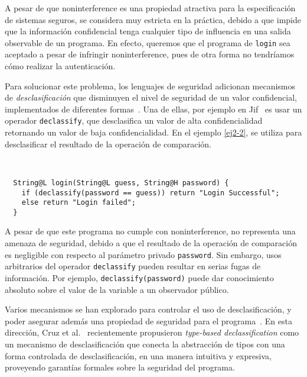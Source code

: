 A pesar de que noninterference es una propiedad atractiva para la especificación de sistemas seguros, se considera muy estricta en la práctica, debido a que impide que la información confidencial tenga cualquier tipo de influencia en una salida observable de un programa. En efecto, queremos que el programa de \texttt{login} sea aceptado a pesar de infringir noninterference, pues de otra forma no tendríamos cómo realizar la autenticación.

Para solucionar este problema, los lenguajes de seguridad adicionan mecanismos de \emph{desclasificación} que disminuyen el nivel de seguridad de un valor confidencial, implementados de diferentes formas~\cite{sabelfeldSands:JCS09}. Una de ellas, por ejemplo en Jif~\cite{jif} es usar un operador \texttt{declassify}, que desclasifica un valor de alta confidencialidad retornando un valor de baja confidencialidad. En el ejemplo \ref{ej2-2}, se utiliza para desclasificar el resultado de la operación de comparación.
\clearpage
\begin{ej} \ \\
  \normalfont
  \label{ej2-2}
\begin{lstlisting}
  String@L login(String@L guess, String@H password) {
    if (declassify(password == guess)) return "Login Successful";
    else return "Login failed";
  }
\end{lstlisting}
\end{ej}


A pesar de que este programa no cumple con noninterference, no representa una amenaza de seguridad, debido a que el resultado de la operación de comparación es negligible con respecto al parámetro privado \texttt{password}. Sin embargo, usos arbitrarios del operador \texttt{declassify} pueden resultar en serias fugas de información. Por ejemplo, \texttt{declassify(password)} puede dar conocimiento absoluto sobre el valor de la variable a un observador público.

Varios mecanismos se han explorado para controlar el uso de desclasificación, y poder asegurar además una propiedad de seguridad para el programa~\cite{sabelfeldSands:JCS09}. En esta dirección, Cruz et al.~\cite{cruzAl:ecoop2017} recientemente propusieron \emph{type-based declassification} como un mecanismo de desclasificación que conecta la abstracción de tipos con una forma controlada de desclasificación, en una manera intuitiva y expresiva, proveyendo garantías formales sobre la seguridad del programa.

